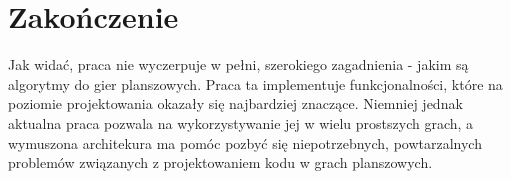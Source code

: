 \documentclass[polish,shortabstract,inz]{iithesis}
\begin{document}
\chapter{Zakończenie}

Jak widać, praca nie wyczerpuje w pełni, szerokiego zagadnienia - jakim są algorytmy do gier planszowych.
Praca ta implementuje funkcjonalności, które na poziomie projektowania okazały się najbardziej znaczące.
Niemniej jednak aktualna praca pozwala na wykorzystywanie jej w wielu prostszych grach, a wymuszona architekura ma pomóc pozbyć się niepotrzebnych, powtarzalnych problemów związanych z projektowaniem kodu w grach planszowych.


\end{document}
